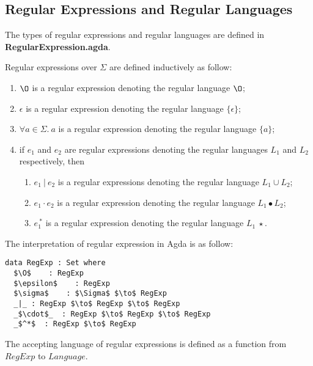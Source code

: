 \subsection{Regular Expressions and Regular Languages}
\par The types of regular expressions and regular languages are defined in
\textbf{RegularExpression.agda}. 

\begin{defn}
\label{defn:regex}
\noindent Regular expressions over \(\Sigma\) are defined inductively as follow: 
\begin{enumerate}[nolistsep]
  \item \(\O\) is a regular expression denoting the regular language \(\O\);
  \item \(\epsilon\) is a regular expression denoting the regular language \(\{\epsilon\}\);
  \item \(\forall a\in\Sigma.\ a\) is a regular expression denoting the regular language \(\{a\}\);
  \item if \(e_{1}\) and \(e_{2}\) are regular expressions denoting the regular
    languages \(L_1\) and \(L_2\) respectively, then
    \begin{enumerate}[nolistsep]
      \item \(e_{1}\ |\ e_{2}\) is a regular expressions denoting the
        regular language \(L_1 \cup L_2\);
      \item \(e_{1}\cdot e_{2}\) is a regular expression denoting the
        regular language \(L_1\bullet L_2\);
      \item \(e_{1}^{\ *}\) is a regular expression denoting the regular
        language \(L_1\ \star\).
     \end{enumerate}
\end{enumerate}
\end{defn}

\par The interpretation of regular expression in Agda is as follow:

\begin{lstlisting}[mathescape=true,xleftmargin=.3\textwidth]
data RegExp : Set where
  $\O$    : RegExp
  $\epsilon$    : RegExp
  $\sigma$    : $\Sigma$ $\to$ RegExp
  _|_ : RegExp $\to$ RegExp $\to$ RegExp
  _$\cdot$_  : RegExp $\to$ RegExp $\to$ RegExp
  _$^*$  : RegExp $\to$ RegExp
\end{lstlisting} 

\par The accepting language of regular expressions is defined as
a function from \(RegExp\) to \(Language\). 

